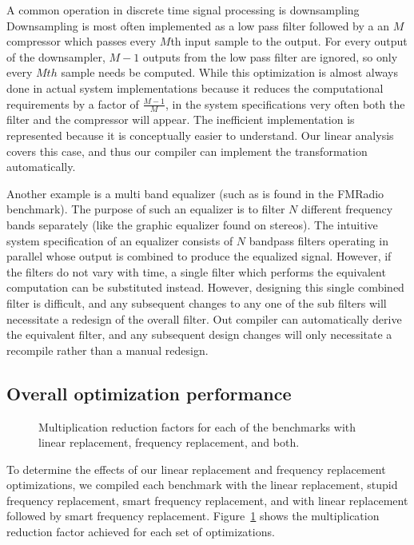 A common operation in discrete time signal processing is downsampling
Downsampling is most often implemented as a low pass filter followed by a 
an $M$ compressor which passes every $M$th input sample to the output.
For every output of the downsampler, $M-1$ outputs from the low pass filter
are ignored, so only every $Mth$ sample needs be computed.
While this optimization is almost always done in actual system implementations because it reduces 
the computational requirements by a factor of $\frac{M-1}{M}$, in the system specifications
very often both the filter and the compressor will appear. The inefficient
implementation is represented because it is conceptually easier to understand. 
Our linear analysis covers this case, and thus our compiler can implement the transformation
automatically.

Another example is a multi band equalizer (such as is found in the FMRadio benchmark). 
The purpose of such an equalizer is to filter $N$ different frequency bands 
separately (like the graphic equalizer found on stereos). The intuitive system specification 
of an equalizer consists of $N$ bandpass filters operating in parallel whose output 
is combined to produce the equalized signal. However, if the filters do not vary with time, 
a single filter which performs the equivalent computation can be substituted instead. 
However, designing this single combined filter is difficult, and any subsequent changes to 
any one of the sub filters will necessitate a redesign of the overall filter. 
Out compiler can automatically derive the equivalent filter, and any subsequent design changes
will only necessitate a recompile rather than a manual redesign.


\subsection{Overall optimization performance}

\begin{figure}
\center
\epsfxsize=3.0in
\caption{Multiplication reduction factors for each of the benchmarks with linear replacement, frequency replacement, and both.}
\label{fig:linear-freq-both}
\end{figure}

To determine the effects of our linear replacement and frequency replacement 
optimizations, we compiled each benchmark with the linear 
replacement, stupid frequency replacement, smart frequency replacement,
and with linear replacement followed by smart frequency replacement. 
Figure~\ref{fig:linear-freq-both} shows the multiplication reduction factor 
achieved for each set of optimizations.

